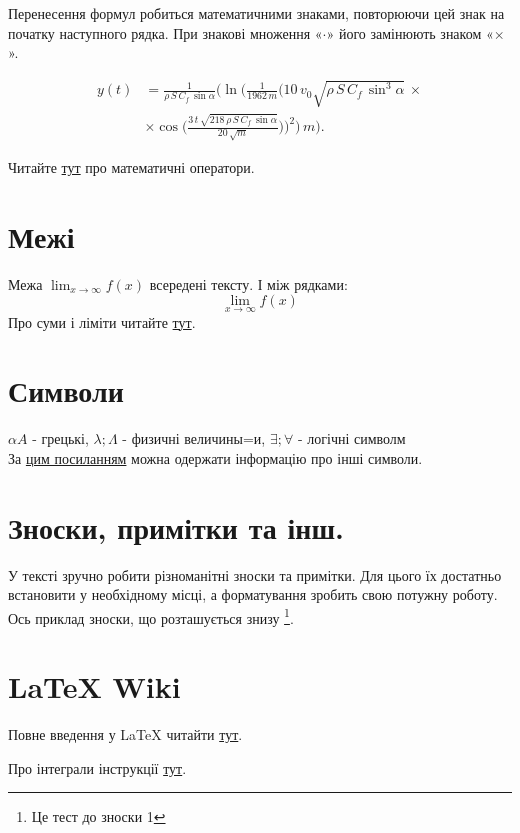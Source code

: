 Перенесення формул робиться математичними знаками, повторюючи цей знак на початку наступного рядка. При знакові множення «$\cdot$» його замінюють знаком «$\times$».

\begin{align}
\label{xt:eq}
y(t) &= \frac{1}{{\rho}\,{S}\,{C_{f}}\,\sin\alpha}\Big(\ln\Big(\frac{1}{1962\,m}\Big(10\,v_0\sqrt{\rho\,S\,C_f\,\sin^3\alpha}\,\times \nonumber\\  &\times\cos\Big(\frac{3\,t\,\sqrt{218\,\rho\,S\,C_f\,\sin\alpha}}{20\,\sqrt{m}}\Big)\Big)^2\Big)\,m\Big).
\end{align}

Читайте \href{https://www.overleaf.com/learn/latex/Operators}{тут} про математичні оператори.

\section{Межі}
    
    Межа \(\lim_{x\to\infty} f(x)\) всередені тексту.
    І між рядками:
    \[
    \lim_{x\to\infty} f(x)
    \]
Про суми і ліміти читайте 
\href{https://www.overleaf.com/learn/latex/Integrals,_sums_and_limits#Sums_and_products}{тут}.

\section{Символи}
$\alpha A$ - грецькі,  $ \lambda; \Lambda$ - физичні величины=и, $\exists; \forall$ - логічні символм\\
За \href{https://www.overleaf.com/learn/latex/List_of_Greek_letters_and_math_symbols}{цим посиланням} можна одержати інформацію про інші символи. 

\section{Зноски, примітки та інш.}
У тексті зручно робити різноманітні зноски та примітки. Для цього їх достатньо встановити у необхідному місці, а форматування зробить свою потужну роботу. Ось приклад зноски, що розташується знизу \footnote{Це тест до зноски 1}. 

\section{{\LaTeX} Wiki}
Повне введення у {\LaTeX} читайти \href{https://www.texlive.info/CTAN/info/lshort/russian/lshortru.pdf}{тут}.

Про інтеграли інструкції 
\href{https://www.overleaf.com/learn/latex/Integrals,_sums_and_limits#Integrals}{тут}.



